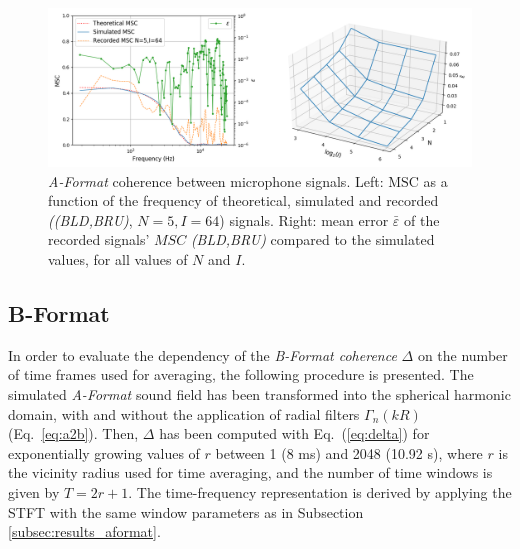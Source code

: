 \begin{figure}[th]
	\includegraphics[width=\textwidth]{Figures/CoherenceEstimation/Untitled1}
    \caption{\label{fig:Fig1}\textit{A-Format} coherence between microphone signals. Left: $\text{MSC}$ as a function of the frequency of theoretical, simulated and recorded \textit{((BLD,BRU)},  $N=5, I=64$) signals. Right: mean error $\bar{\varepsilon}$ of the recorded signals' $MSC$ \textit{(BLD,BRU)} compared to the simulated values, for all values of $N$ and $I$.}
\end{figure}



\subsection{B-Format} 

In order to evaluate the dependency of the \textit{B-Format coherence} $\Delta$ on the number of time frames used for averaging, the following procedure is presented.
The simulated \textit{A-Format} sound field has been transformed into the spherical harmonic domain, with and without the application of radial filters $\Gamma_n(kR)$ (Eq.~\ref{eq:a2b}). Then, $\Delta$ has been computed with Eq.~(\ref{eq:delta}) for exponentially growing values of $r$ between 1 (8 ms) and 2048 (10.92 s), where $r$ is the vicinity radius used for time averaging, and the number of time windows is given by $T = 2r+1$.
The time-frequency representation is derived by applying the STFT with the same window parameters as in Subsection \ref{subsec:results_aformat}.\\

